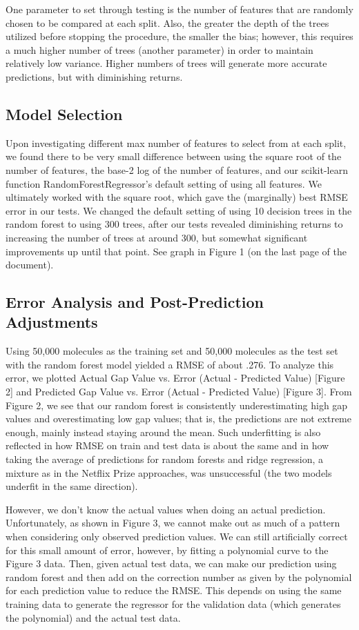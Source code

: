 \documentclass{article}
\begin{document}
One parameter to set through testing is the number of features that are randomly chosen to be compared at each split. Also, the greater the depth of the trees utilized before stopping the procedure, the smaller the bias; however, this requires a much higher number of trees (another parameter) in order to maintain relatively low variance. Higher numbers of trees will generate more accurate predictions, but with diminishing returns.


\subsection{Model Selection}

Upon investigating different max number of features to select from at each split, we found there to be very small difference between using the square root of the number of features, the base-2 log of the number of features, and our scikit-learn function RandomForestRegressor's default setting of using all features. We ultimately worked with the square root, which gave the (marginally) best RMSE error in our tests. We changed the default setting of using 10 decision trees in the random forest to using 300 trees, after our tests revealed diminishing returns to increasing the number of trees at around 300, but somewhat significant improvements up until that point. See graph in Figure 1 (on the last page of the document).

\subsection{Error Analysis and Post-Prediction Adjustments}

Using 50,000 molecules as the training set and 50,000 molecules as the test set with the random forest model yielded a RMSE of about .276. To analyze this error, we plotted Actual Gap Value vs. Error (Actual - Predicted Value) [Figure 2] and Predicted Gap Value vs. Error (Actual - Predicted Value) [Figure 3]. From Figure 2, we see that our random forest is consistently underestimating high gap values and overestimating low gap values; that is, the predictions are not extreme enough, mainly instead staying around the mean. Such underfitting is also reflected in how RMSE on train and test data is about the same and in how taking the average of predictions for random forests and ridge regression, a mixture as in the Netflix Prize approaches, was unsuccessful (the two models underfit in the same direction).

However, we don't know the actual values when doing an actual prediction. Unfortunately, as shown in Figure 3, we cannot make out as much of a pattern when considering only observed prediction values. We can still artificially correct for this small amount of error, however, by fitting a polynomial curve to the Figure 3 data. Then, given actual test data, we can make our prediction using random forest and then add on the correction number as given by the polynomial for each prediction value to reduce the RMSE. This depends on using the same training data to generate the regressor for the validation data (which generates the polynomial) and the actual test data.
\end{document}
